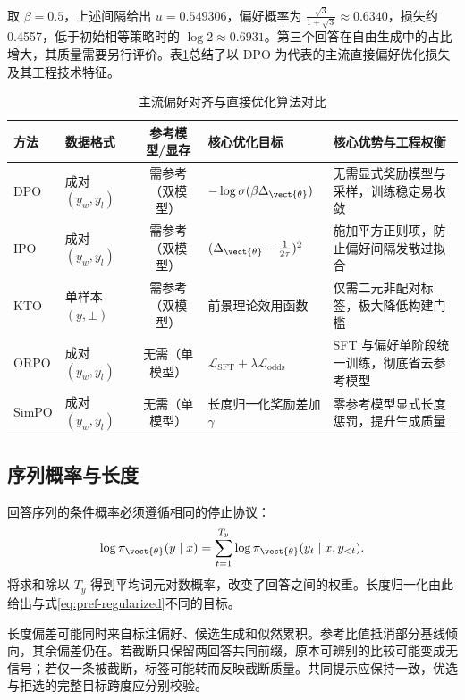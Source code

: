 \documentclass[../textbook.tex]{subfiles}
\begin{document}
取 $\beta=0.5$，上述间隔给出 $u=0.549306$，偏好概率为 $\frac{\sqrt3}{1+\sqrt3}\approx0.6340$，损失约0.4557，低于初始相等策略时的 $\log2\approx0.6931$。第三个回答在自由生成中的占比增大，其质量需要另行评价。表\ref{tab:alignment-losses}总结了以 DPO 为代表的主流直接偏好优化损失及其工程技术特征。

\begin{table}[htbp]
\centering
\small
\setlength{\tabcolsep}{3.5pt}
\caption{主流偏好对齐与直接优化算法对比}
\label{tab:alignment-losses}
\begin{tabularx}{\linewidth}{lp{18mm}cp{26mm}X}
\toprule
方法 & 数据格式 & 参考模型/显存 & 核心优化目标 & 核心优势与工程权衡 \\
\midrule
DPO & 成对 $(y_w, y_l)$ & 需参考（双模型） & $-\log \sigma(\beta \Delta_{\vect{\theta}})$ & 无需显式奖励模型与采样，训练稳定易收敛 \\
IPO & 成对 $(y_w, y_l)$ & 需参考（双模型） & $(\Delta_{\vect{\theta}} - \frac{1}{2\tau})^2$ & 施加平方正则项，防止偏好间隔发散过拟合 \\
KTO & 单样本 $(y, \pm)$ & 需参考（双模型） & 前景理论效用函数 & 仅需二元非配对标签，极大降低构建门槛 \\
ORPO & 成对 $(y_w, y_l)$ & 无需（单模型） & $\mathcal{L}_{\mathrm{SFT}} + \lambda \mathcal{L}_{\mathrm{odds}}$ & SFT 与偏好单阶段统一训练，彻底省去参考模型 \\
SimPO & 成对 $(y_w, y_l)$ & 无需（单模型） & 长度归一化奖励差加 $\gamma$ & 零参考模型显式长度惩罚，提升生成质量 \\
\bottomrule
\end{tabularx}
\end{table}

\subsection{序列概率与长度}
回答序列的条件概率必须遵循相同的停止协议：
\begin{equation}
 \log\pi_{\vect{\theta}}(y\mid x)=\sum_{t=1}^{T_y}\log\pi_{\vect{\theta}}(y_t\mid x,y_{<t}).
 \label{eq:pref-sequence-logprob}
\end{equation}
将求和除以 $T_y$ 得到平均词元对数概率，改变了回答之间的权重。长度归一化由此给出与式\eqref{eq:pref-regularized}不同的目标。

长度偏差可能同时来自标注偏好、候选生成和似然累积。参考比值抵消部分基线倾向，其余偏差仍在。若截断只保留两回答共同前缀，原本可辨别的比较可能变成无信号；若仅一条被截断，标签可能转而反映截断质量。共同提示应保持一致，优选与拒选的完整目标跨度应分别校验。
\end{document}

